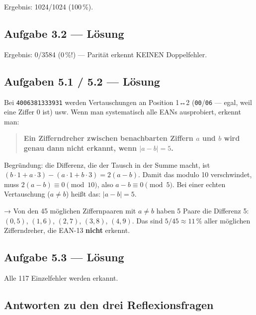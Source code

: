 
Ergebnis: 1024/1024 (100\,\%).

\subsection*{Aufgabe 3.2 — Lösung}


Ergebnis: 0/3584 (0\,\%!) — Parität erkennt KEINEN Doppelfehler.

\subsection*{Aufgaben 5.1 / 5.2 — Lösung}

Bei \texttt{4006381333931} werden Vertauschungen an Position 1↔2
(\texttt{00}/\texttt{06} — egal, weil eine Ziffer 0 ist) usw. Wenn
man systematisch alle EANs ausprobiert, erkennt man:

\begin{quote}
\textbf{Ein Zifferndreher zwischen benachbarten Ziffern $a$ und $b$
wird genau dann nicht erkannt, wenn $|a - b| = 5$.}
\end{quote}

Begründung: die Differenz, die der Tausch in der Summe macht, ist
$(b \cdot 1 + a \cdot 3) - (a \cdot 1 + b \cdot 3) = 2(a - b)$. Damit
das modulo 10 verschwindet, muss $2(a-b) \equiv 0 \pmod{10}$, also
$a - b \equiv 0 \pmod{5}$. Bei einer echten Vertauschung ($a \ne b$)
heißt das: $|a-b| = 5$.

→ Von den 45 möglichen Ziffernpaaren mit $a \ne b$ haben 5 Paare die
Differenz 5: $(0,5)$, $(1,6)$, $(2,7)$, $(3,8)$, $(4,9)$. Das sind
$5/45 \approx 11\,\%$ aller möglichen Zifferndreher, die EAN-13
\textbf{nicht} erkennt.

\subsection*{Aufgabe 5.3 — Lösung}


Alle 117 Einzelfehler werden erkannt.

\subsection*{Antworten zu den drei Reflexionsfragen}

